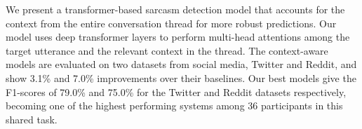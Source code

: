We present a transformer-based sarcasm detection model that accounts for the context from the entire conversation thread for more robust predictions. Our model uses deep transformer layers to perform multi-head attentions among the target utterance and the relevant context in the thread. The context-aware models are evaluated on two datasets from social media, Twitter and Reddit, and show 3.1\% and 7.0\% improvements over their baselines. Our best models give the F1-scores of 79.0\% and 75.0\% for the Twitter and Reddit datasets respectively, becoming one of the highest performing systems among 36 participants in this shared task.
